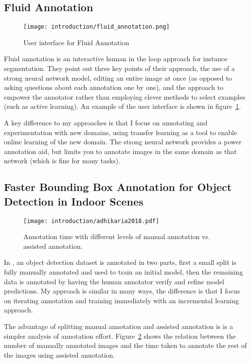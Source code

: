 \subsection{Fluid Annotation \cite{Andriluka2018}}
\begin{figure}[h]
  \centering
  \texttt{[image: introduction/fluid\_annotation.png]}
  \caption{User interface for Fluid Annotation \cite{Andriluka2018}}  
  \label{fig:fluid_annotation}
\end{figure}

Fluid annotation is an interactive human in the loop approach for instance segmentation. They point out three key points of their approach, the use of a strong neural network model, editing an entire image at once (as opposed to asking questions about each annotation one by one), and the approach to empower the annotator rather than employing clever methods to select examples (such as active learning). An example of the user interface is shown in figure~\ref{fig:fluid_annotation}.

A key difference to my approaches is that I focus on annotating and experimentation with new domains, using transfer learning as a tool to enable online learning of the new domain. The strong neural network provides a power annotation aid, but limits you to annotate images in the same domain as that network (which is fine for many tasks).

\subsection{Faster Bounding Box Annotation for Object Detection in Indoor Scenes}

\begin{figure}[h]
  \centering
  \texttt{[image: introduction/adhikaria2018.pdf]}
  \caption{Annotation time with different levels of manual annotation vs. assisted annotation. \cite{Adhikaria2018}}  
  \label{fig:adhikaria2018}
\end{figure}

In \cite{Adhikaria2018}, an object detection dataset is annotated in two parts, first a small split is fully manually annotated and used to train an initial model, then the remaining data is annotated by having the human annotator verify and refine model predictions. My approach is similar in many ways, the difference is that I focus on iterating annotation and training immediately with an incremental learning approach.

The advantage of splitting manual annotation and assisted annotation is is a simpler analysis of annotation effort. Figure~\ref{fig:adhikaria2018} shows the relation between the number of manually annotated images and the time taken to annotate the rest of the images using assisted annotation.



